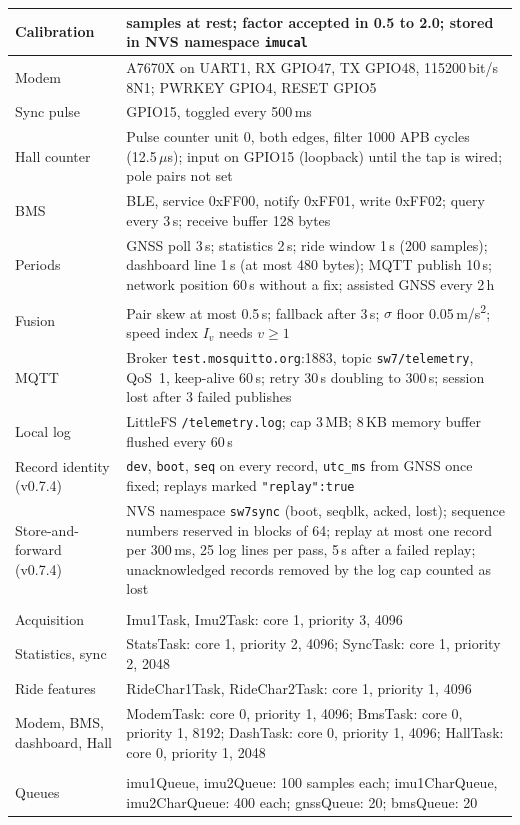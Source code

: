 \begin{longtable}{|>{\raggedright\arraybackslash}p{4.0cm}|>{\raggedright\arraybackslash}p{9.8cm}|}
Calibration & 200 samples at rest; factor accepted in 0.5 to 2.0; stored in NVS namespace \texttt{imucal} \\ \hline
Modem & A7670X on UART1, RX GPIO47, TX GPIO48, 115200\,bit/s 8N1; PWRKEY GPIO4, RESET GPIO5 \\ \hline
Sync pulse & GPIO15, toggled every 500\,ms \\ \hline
Hall counter & Pulse counter unit 0, both edges, filter 1000 APB cycles (12.5\,$\mu$s); input on GPIO15 (loopback) until the tap is wired; pole pairs not set \\ \hline
BMS & BLE, service 0xFF00, notify 0xFF01, write 0xFF02; query every 3\,s; receive buffer 128 bytes \\ \hline
Periods & GNSS poll 3\,s; statistics 2\,s; ride window 1\,s (200 samples); dashboard line 1\,s (at most 480 bytes); MQTT publish 10\,s; network position 60\,s without a fix; assisted GNSS every 2\,h \\ \hline
Fusion & Pair skew at most 0.5\,s; fallback after 3\,s; $\sigma$ floor 0.05\,m/s\textsuperscript{2}; speed index $I_v$ needs $v \ge 1$ \\ \hline
MQTT & Broker \texttt{test.mosquitto.org}:1883, topic \texttt{sw7/telemetry}, QoS~1, keep-alive 60\,s; retry 30\,s doubling to 300\,s; session lost after 3 failed publishes \\ \hline
Local log & LittleFS \texttt{/telemetry.log}; cap 3\,MB; 8\,KB memory buffer flushed every 60\,s \\ \hline
Record identity (v0.7.4) & \texttt{dev}, \texttt{boot}, \texttt{seq} on every record, \texttt{utc\_ms} from GNSS once fixed; replays marked \texttt{"replay":true} \\ \hline
Store-and-forward (v0.7.4) & NVS namespace \texttt{sw7sync} (boot, seqblk, acked, lost); sequence numbers reserved in blocks of 64; replay at most one record per 300\,ms, 25 log lines per pass, 5\,s after a failed replay; unacknowledged records removed by the log cap counted as lost \\ \hline
\multicolumn{2}{|l|}{Tasks (name: core, priority, stack in bytes)} \\ \hline
Acquisition & Imu1Task, Imu2Task: core 1, priority 3, 4096 \\ \hline
Statistics, sync & StatsTask: core 1, priority 2, 4096; SyncTask: core 1, priority 2, 2048 \\ \hline
Ride features & RideChar1Task, RideChar2Task: core 1, priority 1, 4096 \\ \hline
Modem, BMS, dashboard, Hall & ModemTask: core 0, priority 1, 4096; BmsTask: core 0, priority 1, 8192; DashTask: core 0, priority 1, 4096; HallTask: core 0, priority 1, 2048 \\ \hline
\multicolumn{2}{|l|}{Queues (depth in items)} \\ \hline
Queues & imu1Queue, imu2Queue: 100 samples each; imu1CharQueue, imu2CharQueue: 400 each; gnssQueue: 20; bmsQueue: 20 \\ \hline
\end{longtable}

